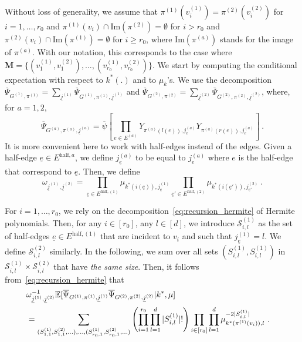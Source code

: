 \documentclass{article}
\begin{document}
            Without loss of generality, we assume that $\pi^{(1)}(v^{(1)}_i)=\pi^{(2)}(v^{(2)}_i)$ for $i=1,\ldots, r_0$ and $\pi^{(1)}(v_i)\cap \mathrm{Im}(\pi^{(2)})=\emptyset$ for $i>r_0$ and $\pi^{(2)}(v_i)\cap \mathrm{Im}(\pi^{(1)})=\emptyset$ for $i\geq r_0$, where $\mathrm{Im}(\pi^{(a)})$ stands for the image of $\pi^{(a)}$. With our notation, this corresponds to the case where $\mathbf{M}=\{(v_1^{(1)},v_1^{(2)}),\ldots, (v_{r_0}^{(1)},v_{r_0}^{(2)})\}$. We start by computing the conditional expectation with respect to $k^*(.)$ and to $\mu_k$'s. We  use the decomposition $\overline{\Psi}_{G^{(1)},\pi^{(1)}}= \sum_{\underline{j}^{(1)}}\overline{\Psi}_{G^{(1)},\pi^{(1)},\underline{j}^{(1)}}$ and $\overline{\Psi}_{G^{(2)},\pi^{(2)}}= \sum_{\underline{j}^{(2)}}\overline{\Psi}_{G^{(2)},\pi^{(2)},\underline{j}^{(2)}}$, where, for $a=1,2$, 
                \[
                \overline{\Psi}_{G^{(a)},\pi^{(a)},\underline{j}^{(a)}} = \overline{\psi}\left[\prod_{e\in E^{(a)}} Y_{\pi^{(a)}(l(e)),j^{(a)}_e}Y_{\pi^{(a)}(r(e)),j^{(a)}_e}  \right]\ . 
                \]
            It is more convenient here to work with half-edges instead of the edges. Given a half-edge $\underline{e}\in E^{\mathrm{half},a}$, we define $j^{(a)}_{\underline{e}}$ to be equal to $j^{(a)}_{e}$ where $e$ is the half-edge that correspond to $\underline{e}$. 
            Then, we define 
            \[
            \omega_{\underline{j}^{(1)},\underline{j}^{(2)}}= \prod_{\underline{e}\in E^{\mathrm{half},(1)}}\mu_{k^*(i(\underline{e})),j^{(1)}_{\underline{e}}} \prod_{\underline{e}'\in E^{\mathrm{half},(2)}} \mu_{k^*(i(\underline{e}')),j^{(2)}_{\underline{e}'}}\ . 
            \]
            
            For $i= 1,\ldots, r_0$, we rely on the decomposition~\eqref{eq:recursion_hermite} of Hermite polynomials. Then, for any $i\in[r_0]$, any $l\in [d]$, we introduce $\mathcal{S}^{(1)}_{i,l}$ as the set of half-edges $\underline{e}\in E^{\mathrm{half},(1)}$ that are incident to $v_i$ and such that $j^{(1)}_{\underline{e}}=l$. We define $\mathcal{S}^{(2)}_{i,l}$ similarly. In the following, we sum over all sets $(S^{(1)}_{i,l},S^{(1)}_{i,l})$ in $\mathcal{S}^{(1)}_{i,l}\times \mathcal{S}^{(2)}_{i,l}$ that have \emph{the same size}. Then, it follows from~\eqref{eq:recursion_hermite} that 
            \begin{eqnarray} \nonumber
            \lefteqn{    \omega_{\underline{j}^{(1)},\underline{j}^{(2)}}^{-1}  \mathbb{E}[\overline{\Psi}_{G^{(1)},\pi^{(1)},\underline{j}^{(1)}}\overline{\Psi}_{G^{(2)},\pi^{(2)},\underline{j}^{(2)}}|k^*,\mu]} &&\\ & = \sum_{(S^{(1)}_{1,1},S^{(2)}_{1,1},\ldots),\ldots, (S^{(1)}_{r_0,1},S^{(2)}_{r_0,1},\ldots)}\left(\prod_{i=1}^{r_0}\prod_{l=1}^d |S^{(1)}_{i,l}|!\right) \prod_{i\in [r_0]}\prod_{l=1}^d 
            \mu^{-2|S^{(1)}_{i,l}|}_{k^*(\pi^{(1)}(v_i)),l}
            \ . \label{eq:cross1}
            \end{eqnarray}
            
\end{document}
